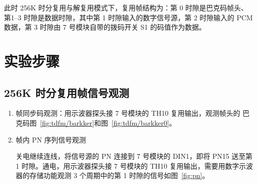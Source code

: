 \documentclass[../main]{subfiles}
\begin{document}
此时 256K 时分复用与解复用模式下，复用帧结构为：第 0 时隙是巴克码帧头、第1--3
时隙是数据时隙，其中第 1 时隙输入的数字信号源，第 2 时隙输入的 PCM 数据，第 3
时隙由 7 号模块自带的拨码开关 S1 的码值作为数据。

\section{实验步骤}%
\label{sec:\arabic{chapter}procedure}

\subsection{256K 时分复用帧信号观测}%
\label{sub:tdfm}



\begin{enumerate}
  \item 帧同步码观测：用示波器探头接 7 号模块的 TH10 复用输出，观测帧头的
    巴克码图~\ref{fig:tdfm/barkker}和图~\ref{fig:tdfm/barkker0}。


  \item 帧内 PN 序列信号观测

    关电继续连线，将信号源的 PN 连接到 7 号模块的 DIN1，即将 PN15 送至第
    1 时隙。通电，用示波器探头接 7 号模块的 TH10 复用输出，需要用数字示波
    器的存储功能观测 3 个周期中的第 1 时隙的信号如图~\ref{fig:pn}。
\end{enumerate}
\end{document}

